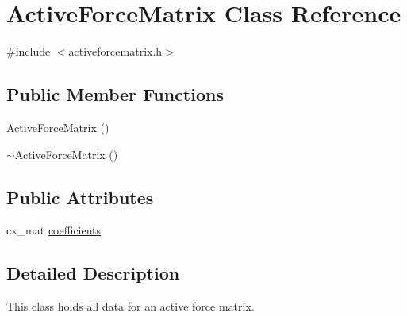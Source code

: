 \hypertarget{class_active_force_matrix}{\section{Active\-Force\-Matrix Class Reference}
\label{class_active_force_matrix}
}


{\ttfamily \#include $<$activeforcematrix.\-h$>$}

\subsection*{Public Member Functions}
\begin{DoxyCompactItemize}
\item 
\hyperlink{class_active_force_matrix_afb5b8d68549da5c8469b313fca84a5c9}{Active\-Force\-Matrix} ()
\item 
\hyperlink{class_active_force_matrix_a45a848d84e22a2503a4b111ccb571c9e}{$\sim$\-Active\-Force\-Matrix} ()
\end{DoxyCompactItemize}
\subsection*{Public Attributes}
\begin{DoxyCompactItemize}
\item 
cx\-\_\-mat \hyperlink{class_active_force_matrix_addea428759e0034e7a3f0ae7c1881762}{coefficients}
\end{DoxyCompactItemize}


\subsection{Detailed Description}
This class holds all data for an active force matrix. 

